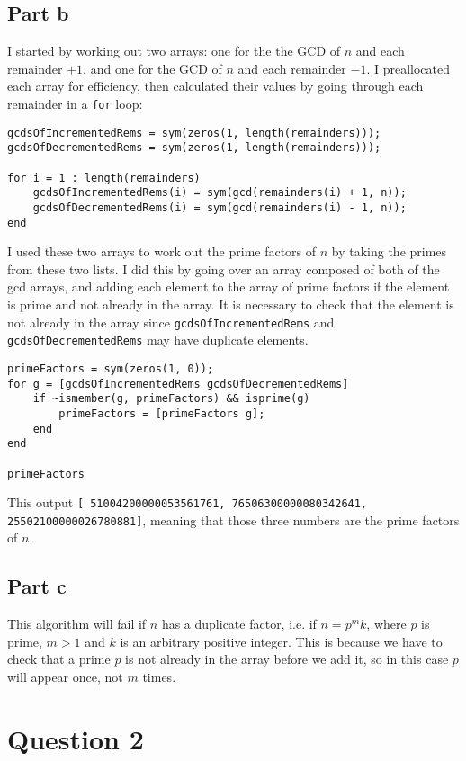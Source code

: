 \documentclass[11pt]{article}
\begin{document}
\subsection*{Part b}
I started by working out two arrays: one for the the GCD of $n$ and each remainder $+ 1$, and one for the GCD of $n$ and each remainder $- 1$. I preallocated each array for efficiency, then calculated their values by going through each remainder in a \texttt{for} loop:
\begin{Verbatim}[xleftmargin=0.5in]
gcdsOfIncrementedRems = sym(zeros(1, length(remainders)));
gcdsOfDecrementedRems = sym(zeros(1, length(remainders)));

for i = 1 : length(remainders)
    gcdsOfIncrementedRems(i) = sym(gcd(remainders(i) + 1, n));
    gcdsOfDecrementedRems(i) = sym(gcd(remainders(i) - 1, n));
end
\end{Verbatim}
I used these two arrays to work out the prime factors of $n$ by taking the primes from these two lists. I did this by going over an array composed of both of the gcd arrays, and adding each element to the array of prime factors if the element is prime and not already in the array. It is necessary to check that the element is not already in the array since \texttt{gcdsOfIncrementedRems} and \texttt{gcdsOfDecrementedRems} may have duplicate elements.
\begin{Verbatim}[xleftmargin=0.5in]
primeFactors = sym(zeros(1, 0));
for g = [gcdsOfIncrementedRems gcdsOfDecrementedRems]        
    if ~ismember(g, primeFactors) && isprime(g)
        primeFactors = [primeFactors g];
    end    
end

primeFactors
\end{Verbatim}
This output \texttt{[ 51004200000053561761, 76506300000080342641, 25502100000026780881]}, meaning that those three numbers are the prime factors of $n$.
\subsection*{Part c}
This algorithm will fail if $n$ has a duplicate factor, i.e. if $n = p^mk$, where $p$ is prime, $m > 1$ and $k$ is an arbitrary positive integer. This is because we have to check that a prime $p$ is not already in the array before we add it, so in this case $p$ will appear once, not $m$ times.
\newpage
\section*{Question 2}
\end{document}
